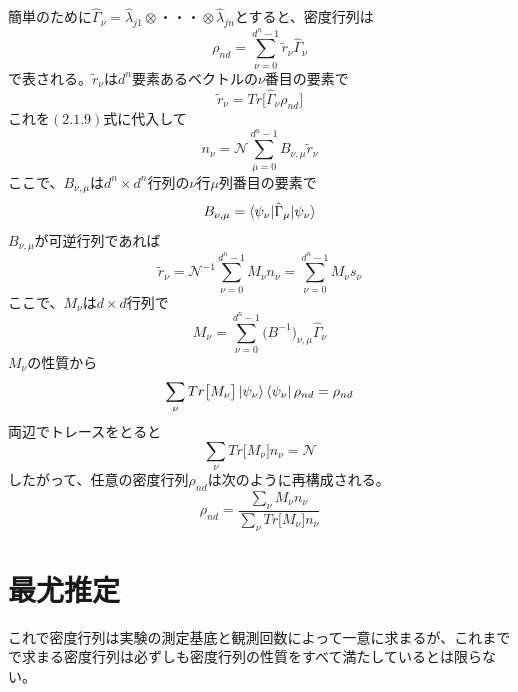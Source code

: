 \documentclass[11pt,a4j,notitlepage]{jreport}
\begin{document}
	簡単のために$\hat{\Gamma}_\nu = \hat{\lambda}_{j 1} \otimes ・・・ \otimes \hat{\lambda}_{j n}$とすると、密度行列は
	\begin{equation}
		\rho_{n d} = \sum_{\nu = 0}^{d^n - 1} \tilde{r}_\nu \hat{\Gamma}_\nu
	\end{equation}
	で表される。$\tilde{r}_\nu$は$d^n$要素あるベクトルの$\nu$番目の要素で
	\begin{equation}
		\tilde{r}_\nu = Tr \big[ \hat{\Gamma}_\nu \rho_{n d} \big]
	\end{equation}
	これを$(2.1.9)$式に代入して
	\begin{equation}
		n_\nu = \mathcal{N} \sum_{\mu = 0}^{d^n - 1} B_{\nu, \mu} \tilde{r}_\nu
	\end{equation}
	ここで、$B_{\nu, \mu}$は$d^n \times d^n$行列の$\nu$行$\mu$列番目の要素で
	\begin{equation}
		B_{\nu, \mu} = \braket{\psi_\nu | \hat{\Gamma}_\mu | \psi_\nu}
	\end{equation}
	$B_{\nu, \mu}$が可逆行列であれば
	\begin{equation}
		\tilde{r}_\nu = \mathcal{N}^{-1} \sum_{\nu = 0}^{d^n - 1} M_\nu n_\nu = \sum_{\nu = 0}^{d^n - 1} M_\nu s_\nu
	\end{equation}
	ここで、$M_\nu$は$d \times d$行列で
	\begin{equation}
		M_\nu = \sum_{\nu = 0}^{d^n - 1} \big( B^{-1} \big)_{\nu, \mu} \hat{\Gamma}_\nu
	\end{equation}
	$M_\nu$の性質から
	\begin{equation}
		\sum_\nu Tr \big[ M_\nu \big] \ket{\psi_\nu} \bra{\psi_\nu} \rho_{n d} = \rho_{n d}
	\end{equation}
	両辺でトレースをとると
	\begin{equation}
		\sum_\nu Tr \big[ M_\nu \big] n_\nu = \mathcal{N}
	\end{equation}
	したがって、任意の密度行列$\rho_{n d}$は次のように再構成される。
	\begin{equation}
		\rho_{n d} = \frac{\sum_\nu M_\nu n_\nu}{\sum_\nu Tr \big[ M_\nu \big] n_\nu} 
	\end{equation}


	\section{最尤推定}

	これで密度行列は実験の測定基底と観測回数によって一意に求まるが、これまでで求まる密度行列は必ずしも密度行列の性質をすべて満たしているとは限らない。
\end{document}
